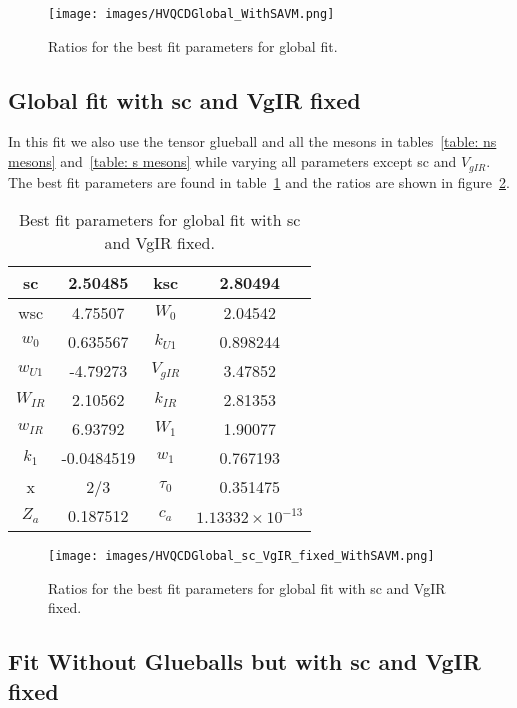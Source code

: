 \documentclass[10 pt]{article}
\begin{document}
\begin{figure}
  \center
  \texttt{[image: images/HVQCDGlobal\_WithSAVM.png]} 
  \caption{Ratios for the best fit parameters for global fit.}
  \label{figure: global fit ratios}
\end{figure}

\subsection{Global fit with sc and VgIR fixed}

In this fit we also use the tensor glueball  and all the mesons in tables~\ref{table: ns mesons} and~\ref{table: s mesons} while varying all parameters except sc and $V_{gIR}$. The best fit parameters are found in table~\ref{table: global fit parameters sc VgIR fixed} and the ratios are shown in figure~\ref{figure: global fit ratios sc VgIR fixed}.

\begin{table}
\centering
\begin{tabular}{ | c | c | c | c |}
\hline
sc & 2.50485 & ksc & 2.80494 \\
\hline
wsc & 4.75507 & $W_0$ & 2.04542 \\
\hline
$w_0$ & 0.635567 & $k_{U1}$ & 0.898244 \\
\hline
$w_{U1}$ & -4.79273 & $V_{gIR}$ & 3.47852 \\
\hline
$W_{IR}$ & 2.10562 & $k_{IR}$ & 2.81353 \\
\hline
$w_{IR}$ & 6.93792 & $W_1$ & 1.90077 \\
\hline
$k_1$ & -0.0484519 & $w_1$ & 0.767193 \\
\hline
x & 2/3 & $\tau_0$ & 0.351475\\
\hline
$Z_a$ & 0.187512 & $c_a$ & $1.13332 \times 10^{-13}$ \\
\hline
\end{tabular}
\caption{Best fit parameters for global fit with sc and VgIR fixed.}
\label{table: global fit parameters sc VgIR fixed} 
\end{table}

\begin{figure}
  \center
  \texttt{[image: images/HVQCDGlobal\_sc\_VgIR\_fixed\_WithSAVM.png]} 
  \caption{Ratios for the best fit parameters for global fit with sc and VgIR fixed.}
  \label{figure: global fit ratios sc VgIR fixed}
\end{figure}

\subsection{Fit Without Glueballs but with sc and VgIR fixed}
\end{document}
